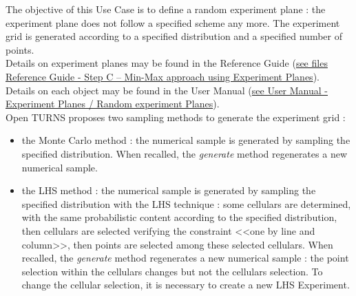 \renewcommand{\filename}{docUC_MinMax_RandomExperimentPlane.tex}
\renewcommand{\filetitle}{UC : Creation of a random experiment plane : Monte Carlo, LHS patterns}

\HeaderIIILevel

\label{randomExpPlane}



The objective of this Use Case is to define a random experiment plane  : the experiment plane does not follow a specified scheme any more. The experiment grid is generated according to a specified distribution and a specified number of points.\\


Details on experiment planes  may be found in the Reference Guide (\href{OpenTURNS_ReferenceGuide.pdf}{see files Reference Guide - Step C -- Min-Max approach using Experiment Planes}).\\

Details on each object may be found in the User Manual  (\href{OpenTURNS_UserManual_TUI.pdf}{see User Manual - Experiment Planes / Random experiment Planes}).\\


Open TURNS proposes two sampling methods to generate the experiment grid :
\begin{itemize}
\item the Monte Carlo method : the numerical sample is generated by sampling the specified distribution. When recalled, the {\itshape generate} method regenerates a new numerical sample.
\item the LHS method : the numerical sample is generated by sampling the specified distribution with the LHS technique :  some cellulars are determined, with the same probabilistic content according to the specified distribution, then cellulars are selected verifying the constraint <<one by line and column>>, then points are selected among these selected cellulars. When recalled, the {\itshape generate} method regenerates a new numerical sample : the point selection within the cellulars changes but not the cellulars selection. To change the cellular selection, it is necessary to create a new LHS Experiment.
\end{itemize}

